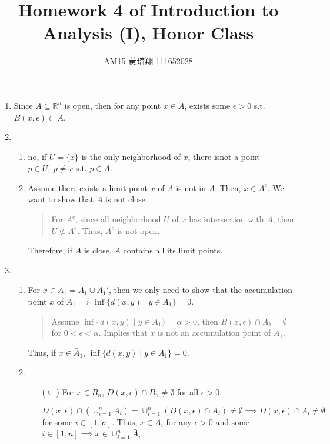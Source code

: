 \documentclass[12pt]{article}
\title{Homework 4 of Introduction to Analysis (I), Honor Class}
\author{AM15 黃琦翔 111652028}
\begin{document}
\maketitle
\begin{enumerate}
    \item Since $A \subseteq \mathbb{R}^n$ is open,
    then for any point $x \in A$, exists some $\epsilon > 0$ s.t. $B(x, \epsilon) \subset A$.

    \item\begin{enumerate}
        \item no, if $U = \lbrace x \rbrace$ is the only neighborhood of $x$, there isnot a point $p\in U,\ p\neq x$ s.t. $p\in A$.
        \item Assume there exists a limit point $x$ of $A$ is not in $A$.
        Then, $x \in A^c$. We want to show that $A$ is not close.
        \begin{quote}
            For $A^c$, since all neighborhood $U$ of $x$ has intersection with $A$, then $U \nsubseteq A^c$. 
            Thus, $A^c$ is not open.
        \end{quote}

        Therefore, if $A$ is close, $A$ contains all its limit points.
    \end{enumerate}

    \item \begin{enumerate}
        \item For $x \in \bar{A}_1 = A_1\cup A_1'$, then we only need to show that the accumulation point $x$ of $A_1\implies \inf\lbrace d(x, y)\mid y \in A_1\rbrace = 0$.
        \begin{quote}
            Assume $\inf\lbrace d(x, y)\mid y \in A_1\rbrace = \alpha > 0$, then $B(x, \epsilon) \cap A_1 = \emptyset$ for $0 < \epsilon < \alpha$.
            Implies that $x$ is not an accumulation point of $A_1$.
        \end{quote}
        Thus, if $x \in \bar{A}_1$, $\inf \lbrace d(x, y) \mid y \in A_1\rbrace = 0$. 

        \item \begin{enumerate}
            \item[($\subseteq$)] For $x \in B_n$, $D(x, \epsilon) \cap B_n \neq \emptyset$ for all $\epsilon > 0$.

            $D(x, \epsilon) \cap (\cup^{n}_{i=1} A_i) = \cup^{n}_{i=1} (D(x, \epsilon) \cap A_i) \neq \emptyset\implies D(x, \epsilon) \cap A_i\neq \emptyset$ for some $i \in [1, n]$.
            Thus, $x \in \bar{A}_i$ for any $\epsilon > 0$ and some $i \in [1, n] \implies x \in \cup_{i=1}^n \bar{A}_i$.
 

\end{enumerate}
\end{enumerate}
\end{enumerate}
\end{document}
